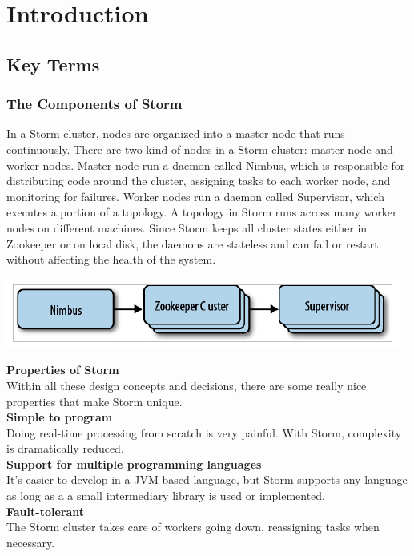\chapter{Introduction}

\section{Key Terms}
\subsection{The Components of Storm}
In a Storm cluster, nodes are organized into a master node that runs continuously. There are two kind of nodes in a Storm cluster: master node and worker nodes. Master node run a daemon called Nimbus, which is responsible for distributing code around the cluster, assigning tasks to each worker node, and monitoring for failures. Worker nodes run a daemon called Supervisor, which executes a portion of a topology. A topology in Storm runs across many worker nodes on different machines. Since Storm keeps all cluster states either in Zookeeper or on local disk, the daemons are stateless and can fail or restart without affecting the health of the system.
\begin{center}
\includegraphics[scale=.5]{../img/img1}\\[2mm]
\end{center}
{\bfseries Properties of Storm}\\[2mm]
Within all these design concepts and decisions, there are some really nice properties that make Storm unique.\\[2mm]
{\bfseries Simple to program}\\[2mm]
Doing real-time processing from scratch is very painful. With Storm, complexity is dramatically reduced.\\[2mm]
{\bfseries Support for multiple programming languages}\\[2mm]
It's easier to develop in a JVM-based language, but Storm supports any language as long as a a small intermediary library is used or implemented.\\[2mm]
{\bfseries Fault-tolerant}\\[2mm]
The Storm cluster takes care of workers going down, reassigning tasks when necessary.\\[2mm]
